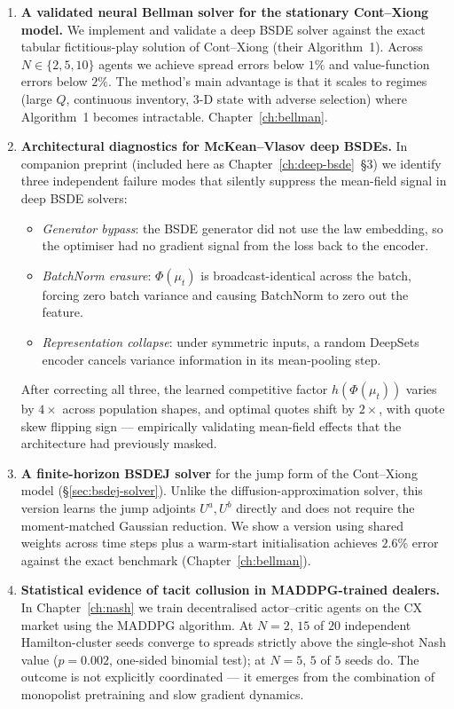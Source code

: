 \begin{enumerate}[leftmargin=2em,label=(C\arabic*)]
\item \textbf{A validated neural Bellman solver for the stationary Cont--Xiong model.}  We implement and validate a deep BSDE solver against the exact tabular fictitious-play solution of Cont--Xiong (their Algorithm~1). Across $N \in \{2, 5, 10\}$ agents we achieve spread errors below $1\%$ and value-function errors below $2\%$. The method's main advantage is that it scales to regimes (large $Q$, continuous inventory, 3-D state with adverse selection) where Algorithm~1 becomes intractable. Chapter~\ref{ch:bellman}.
\item \textbf{Architectural diagnostics for McKean--Vlasov deep BSDEs.}  In companion preprint \cite{garry2026preprint2} (included here as Chapter~\ref{ch:deep-bsde}~\S3) we identify three independent failure modes that silently suppress the mean-field signal in deep BSDE solvers:
\begin{itemize}
  \item \emph{Generator bypass}: the BSDE generator did not use the law embedding, so the optimiser had no gradient signal from the loss back to the encoder.
  \item \emph{BatchNorm erasure}: $\Phi(\mu_t)$ is broadcast-identical across the batch, forcing zero batch variance and causing BatchNorm to zero out the feature.
  \item \emph{Representation collapse}: under symmetric inputs, a random DeepSets encoder cancels variance information in its mean-pooling step.
\end{itemize}
After correcting all three, the learned competitive factor $h(\Phi(\mu_t))$ varies by $4\times$ across population shapes, and optimal quotes shift by $2\times$, with quote skew flipping sign --- empirically validating mean-field effects that the architecture had previously masked.
\item \textbf{A finite-horizon BSDEJ solver} for the jump form of the Cont--Xiong model (\S\ref{sec:bsdej-solver}). Unlike the diffusion-approximation solver, this version learns the jump adjoints $U^a, U^b$ directly and does not require the moment-matched Gaussian reduction. We show a version using shared weights across time steps plus a warm-start initialisation achieves $2.6\%$ error against the exact benchmark (Chapter~\ref{ch:bellman}).
\item \textbf{Statistical evidence of tacit collusion in MADDPG-trained dealers.}  In Chapter~\ref{ch:nash} we train decentralised actor--critic agents on the CX market using the MADDPG algorithm. At $N=2$, $15$ of $20$ independent Hamilton-cluster seeds converge to spreads strictly above the single-shot Nash value ($p = 0.002$, one-sided binomial test); at $N=5$, $5$ of $5$ seeds do. The outcome is not explicitly coordinated --- it emerges from the combination of monopolist pretraining and slow gradient dynamics.
\end{enumerate}

